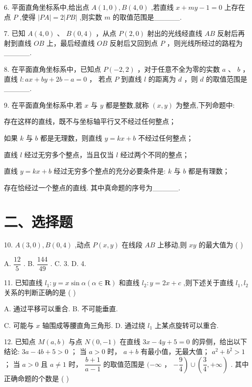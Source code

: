 6. 平面直角坐标系中,给出点 $A\left( {1,0}\right) ,B\left( {4,0}\right)$ ,若直线 $x + {my} - 1 = 0$ 上存在点 $P$ ,使得 $\left| {PA}\right|  = 2\left| {PB}\right|$ ,则实数 $m$ 的取值范围是\_\_\_\_\_.

7. 已知 $A\left( {4,0}\right)$ 、 $B\left( {0,4}\right)$ ，从点 $P\left( {2,0}\right)$ 射出的光线经直线 ${AB}$ 反射后再射到直线 ${OB}$ 上，最后经直线 ${OB}$ 反射后又回到点 $P$ ，则光线所经过的路程为\_\_\_\_\_.

8. 在平面直角坐标系中，已知点 $P\left( {-2,2}\right)$ ，对于任意不全为零的实数 $a$ 、 $b$ ，直线 $l : {ax} + {by} + {2b} - a = 0$ ， 若点 $P$ 到直线 $l$ 的距离为 $d$ ，则 $d$ 的取值范围是\_\_\_\_\_.

9. 在平面直角坐标系中,若 $x$ 与 $y$ 都是整数,就称 $\left( {x,y}\right)$ 为整点,下列命题中:

  存在这样的直线，既不与坐标轴平行又不经过任何整点；

  如果 $k$ 与 $b$ 都是无理数，则直线 $y = {kx} + b$ 不经过任何整点；

  直线 $l$ 经过无穷多个整点，当且仅当 $l$ 经过两个不同的整点；

  直线 $y = {kx} + b$ 经过无穷多个整点的充分必要条件是: $k$ 与 $b$ 都是有理数；

  存在恰经过一个整点的直线. 其中真命题的序号为\_\_\_\_\_.

\section*{二、选择题}

10. $A\left( {3,0}\right) ,B\left( {0,4}\right)$ ,动点 $P\left( {x,y}\right)$ 在线段 ${AB}$ 上移动,则 ${xy}$ 的最大值为 ( )

A. $\dfrac{12}{5}$ . B. $\dfrac{144}{49}$ . C. 3. D. 4.

11. 已知直线 ${l}_{1} : y = x\sin \alpha \left( {\alpha  \in  \mathbf{R}}\right)$ 和直线 ${l}_{2} : y = {2x} + c$ ,则下述关于直线 ${l}_{1},{l}_{2}$ 关系的判断正确的是 ( )

A. 通过平移可以重合. B. 不可能垂直.

C. 可能与 $x$ 轴围成等腰直角三角形. D. 通过绕 ${l}_{1}$ 上某点旋转可以重合.

12. 已知点 $M\left( {a,b}\right)$ 与点 $N\left( {0, - 1}\right)$ 在直线 ${3x} - {4y} + 5 = 0$ 的异侧，给出以下结论:   ${3a} - {4b} + 5 > 0$ ；   当 $a > 0$ 时， $a + b$ 有最小值，无最大值；   ${a}^{2} + {b}^{2} > 1$ ；   当 $a > 0$ 且 $a \neq  1$ 时， $\dfrac{b + 1}{a - 1}$ 的取值范围是 $( - \infty$ ， $\left. {-\dfrac{9}{4}}\right)  \cup  \left( {\dfrac{3}{4}, + \infty }\right)$ . 其中正确命题的个数是 ( )

